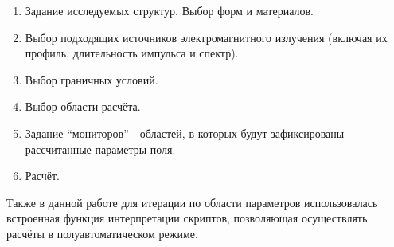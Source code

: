 \begin{enumerate}[label=\arabic*)]
	\item Задание исследуемых структур. Выбор форм и материалов.
	\item Выбор подходящих источников электромагнитного излучения (включая их профиль, длительность импульса и спектр).
	\item Выбор граничных условий.
	\item Выбор области расчёта.
	\item Задание ``мониторов'' - областей, в которых будут зафиксированы рассчитанные параметры поля.
	\item Расчёт.
\end{enumerate}

Также в данной работе для итерации по области параметров использовалась встроенная функция интерпретации скриптов, позволяющая осуществлять расчёты в полуавтоматическом режиме.